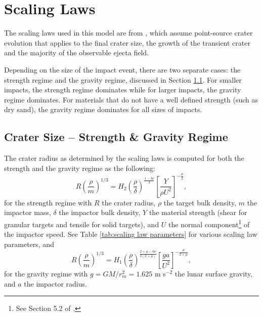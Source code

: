 \documentclass{article}
\begin{document}
\section{Scaling Laws}\label{sec:Scaling Laws}
The scaling laws used in this model are from \cite{housen2011ejecta}, which assume point-source crater evolution that applies to the final crater size, the growth of the transient crater and the majority of the observable ejecta field.

Depending on the size of the impact event, there are two separate cases: the strength regime and the gravity regime, discussed in Section \ref{ssec:Crater Size}. For smaller impacts, the strength regime dominates while for larger impacts, the gravity regime dominates. For materials that do not have a well defined strength (such as dry sand), the gravity regime dominates for all sizes of impacts.


\subsection{Crater Size -- Strength \& Gravity Regime}\label{ssec:Crater Size}

The crater radius as determined by the \cite{housen2011ejecta} scaling laws is computed for both the strength and the gravity regime as the following:
\begin{equation}
R\left(\frac{\rho}{m}\right)^{1/3} = H_2\left(\frac{\rho}{\delta}\right)^{\frac{1-3\nu}{3}}\left[\frac{Y}{\rho U^2}\right]^{-\frac{\mu}{2}},
\end{equation}
for the strength regime with $R$ the crater radius, $\rho$ the target bulk density, $m$ the impactor mass, $\delta$ the impactor bulk density, $Y$ the material strength (shear for granular targets and tensile for solid targets), and $U$ the normal component\footnote{See Section 5.2 of \cite{housen2011ejecta}.} of the impactor speed. See Table \ref{tab:scaling law parameters} for various scaling law parameters, and
\begin{equation}
R\left(\frac{\rho}{m}\right)^{1/3} = H_1\left(\frac{\rho}{\delta}\right)^{\frac{2+\mu-6\nu}{3(2+\mu)}}\left[\frac{ga}{U^2}\right]^{-\frac{\mu}{2+\mu}},
\end{equation}
for the gravity regime with $g = GM/r_m^2 = 1.625$ m s$^{-2}$ the lunar surface gravity, and $a$ the impactor radius.  

%
\end{document}
